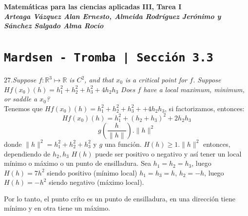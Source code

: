 \documentclass[a4paper,12pt]{article}
\begin{document}
\newcommand{\osf}[2]{\dfrac{#1^2}{#2^2}}
\newcommand{\T}{\Big(2\pi\cdot\sqrt{\dfrac{l}{g}}\Big)}
\newcommand{\alpa}{\dfrac{e^{x \beta -3}{2y\beta +5}}}
\newcommand{\deriv}[2]{\dfrac{\delta #1}{\delta #2}}
\newcommand{\ext}{e^{ax-bt}}
\newcommand{\exy}{e^{((x-1)^2 + (y-3)^2}}
\providecommand{\norm}[1]{\parallel #1\parallel}
\begin{center}
	\textbf{Matemáticas para las ciencias aplicadas III, Tarea I}\\
	\textbf{\textit{Arteaga Vázquez Alan Ernesto, Almeida Rodríguez Jerónimo y Sánchez Salgado Alma Rocío}}
\end{center}

\section{\texttt{Mardsen - Tromba | Sección 3.3}}
\textit{\textbf{$27.$}Suppose $f: \mathbb{R}^3 \mapsto \mathbb{R}$ is $C^2$, and that $x_{0}$ is a critical point for $f$. Suppose $Hf (x_{0})(h) = h_{1}^2 + h_{2}^2 + h_{3}^2 + 4h_{2}h_{3}$ Does $f$ have a local maximum, minimum, or saddle a $x_{0}$?}\\

Tenemos que $Hf(x_0)(h) = h_1^2+h_2^2+h_3^2++4h_2  h_3$, si factorizamos, entonces: 
\[Hf(x_0)(h)= h_1^2+(h_2+h_3)^2+2h_2h_3\]
\[g \left( \dfrac{h}{ \parallel h \parallel}\right). \parallel h \parallel^2\]
donde $\norm{h} ^2 = h_1^2+h_2^2+h_3^2$ y $g $ una función. $H(h)\geq 1. \norm{h}^2$ entonces, dependiendo de $h_2, h_3$  $H(h)$ puede ser positivo o negativo y así tener un local mínimo o máximo o un punto de ensilladura.
Sea $h_1=h_2=h_3$, luego $H(h)= 7h^2$ siendo positivo (mínimo local)
$h_1=h_3= h$, $h_2 = -h$, luego $H(h) = -h^2$ siendo negativo (máximo local). 

Por lo tanto, el punto críto es un punto de ensilladura, en una dirección tiene mínimo y en otra tiene un máximo.
\end{document}
